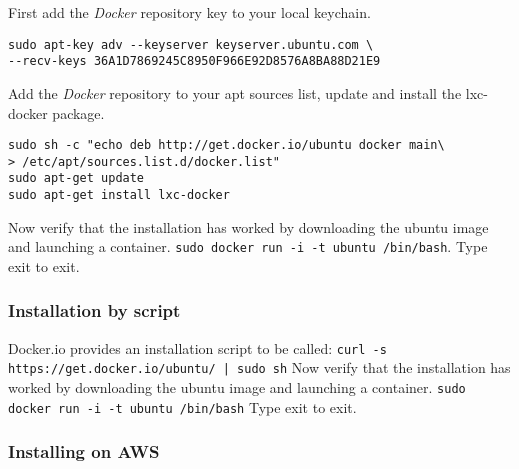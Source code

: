 \documentclass[11pt]{article}
\begin{document}
First add the \emph{Docker} repository key to your local keychain.

\begin{verbatim}
sudo apt-key adv --keyserver keyserver.ubuntu.com \
--recv-keys 36A1D7869245C8950F966E92D8576A8BA88D21E9
\end{verbatim}
Add the \emph{Docker} repository to your apt sources list, update and install
the lxc-docker package.

\begin{verbatim}
sudo sh -c "echo deb http://get.docker.io/ubuntu docker main\
> /etc/apt/sources.list.d/docker.list"
sudo apt-get update
sudo apt-get install lxc-docker
\end{verbatim}
Now verify that the installation has worked by downloading the ubuntu
image and launching a container. \texttt{sudo docker run -i -t ubuntu /bin/bash}.
Type exit to exit.
\subsubsection{Installation by script}
\label{sec-2-2-3}

Docker.io provides an installation script to be called: \texttt{curl -s https://get.docker.io/ubuntu/ | sudo sh}
Now verify that the installation has worked by downloading the ubuntu
image and launching a container. \texttt{sudo docker run -i -t ubuntu /bin/bash}
Type exit to exit.
\subsubsection{Installing on AWS}
\label{sec-2-2-4}
\end{document}

